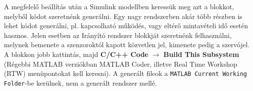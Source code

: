 A megfelelő beállítás után a Simulink modellben keressük meg azt a blokkot, melyből kódot szeretnénk generálni. Egy nagy rendszerben akár több részben is lehet kódot generálni, pl. kapcsolható működés, vagy eltérő mintavételi idő esetén hasznos. Jelen esetben az Irányító rendszer blokkját szeretnénk felhasználni, melynek bemenete a szenzoroktól kapott közvetlen jel, kimenete pedig a szervójel. A blokkon jobb kattintás, majd \textbf{C/C++ Code} $\rightarrow$ \textbf{Build This Subsystem} (Régebbi MATLAB verziókban MATLAB Coder, illetve Real Time Workshop (RTW) menüpontokat kell keresni). A generált fileok a \verb!MATLAB Current Working Folder!-be kerülnek, nem a generált rendszer mellé.









